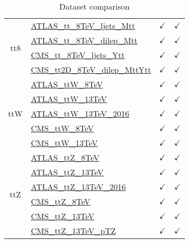 \documentclass{article}
\begin{document}
\begin{table}[H]
\begin{tabular}{|c|l|c|c|}
\multirow{4}{*}{tt8}
 & \href{https://arxiv.org/abs/1511.04716}{ATLAS_tt_8TeV_ljets_Mtt}  & $\checkmark$ & $\checkmark$\\ \cline{2-4}
 & \href{https://arxiv.org/abs/1607.07281}{ATLAS_tt_8TeV_dilep_Mtt}  & $\checkmark$ & $\checkmark$\\ \cline{2-4}
 & \href{https://arxiv.org/abs/1505.04480}{CMS_tt_8TeV_ljets_Ytt}  & $\checkmark$ & $\checkmark$\\ \cline{2-4}
 & \href{https://arxiv.org/abs/1703.01630}{CMS_tt2D_8TeV_dilep_MttYtt}  & $\checkmark$ & $\checkmark$
\\ \hline
\multirow{5}{*}{ttW}
 & \href{https://arxiv.org/abs/1509.05276}{ATLAS_ttW_8TeV}  & $\checkmark$ & $\checkmark$\\ \cline{2-4}
 & \href{https://arxiv.org/abs/1609.01599}{ATLAS_ttW_13TeV}  & $\checkmark$ & $\checkmark$\\ \cline{2-4}
 & \href{https://arxiv.org/abs/1901.03584}{ATLAS_ttW_13TeV_2016}  & $\checkmark$ & $\checkmark$\\ \cline{2-4}
 & \href{https://arxiv.org/abs/1510.01131}{CMS_ttW_8TeV}  & $\checkmark$ & $\checkmark$\\ \cline{2-4}
 & \href{https://arxiv.org/abs/1711.02547}{CMS_ttW_13TeV}  & $\checkmark$ & $\checkmark$
\\ \hline
\multirow{6}{*}{ttZ}
 & \href{https://arxiv.org/abs/1509.05276}{ATLAS_ttZ_8TeV}  & $\checkmark$ & $\checkmark$\\ \cline{2-4}
 & \href{https://arxiv.org/abs/1609.01599}{ATLAS_ttZ_13TeV}  & $\checkmark$ & $\checkmark$\\ \cline{2-4}
 & \href{https://arxiv.org/abs/1901.03584}{ATLAS_ttZ_13TeV_2016}  & $\checkmark$ & $\checkmark$\\ \cline{2-4}
 & \href{https://arxiv.org/abs/1510.01131}{CMS_ttZ_8TeV}  & $\checkmark$ & $\checkmark$\\ \cline{2-4}
 & \href{https://arxiv.org/abs/1711.02547}{CMS_ttZ_13TeV}  & $\checkmark$ & $\checkmark$\\ \cline{2-4}
 & \href{https://arxiv.org/abs/1907.11270}{CMS_ttZ_13TeV_pTZ}  & $\checkmark$ & $\checkmark$
\\ \hline
\end{tabular}
\caption{Dataset comparison}
\end{table}
\end{document}
